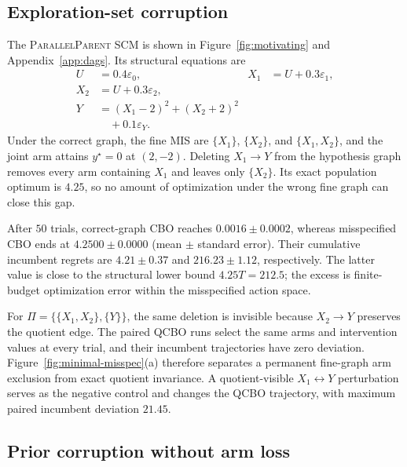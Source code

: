 \documentclass[twoside]{article}
\begin{document}
\subsection{Exploration-set corruption}
\label{sec:exp-a}

The \textsc{ParallelParent} SCM is shown in Figure~\ref{fig:motivating} and
Appendix~\ref{app:dags}. Its structural equations are
\begin{equation}
 \begin{aligned}
 U&=0.4\varepsilon_0,& X_1&=U+0.3\varepsilon_1,\\
 X_2&=U+0.3\varepsilon_2,\\
 Y&=(X_1-2)^2+(X_2+2)^2\\
  &\quad+0.1\varepsilon_Y.
 \end{aligned}
 \label{eq:parallel-parent-scm}
\end{equation}
Under the correct graph, the fine MIS are
$\{X_1\}$, $\{X_2\}$, and $\{X_1,X_2\}$, and the joint arm attains
$y^\star=0$ at $(2,-2)$. Deleting $X_1\to Y$ from the hypothesis graph
removes every arm containing $X_1$ and leaves only $\{X_2\}$. Its exact
population optimum is $4.25$, so no amount of optimization under the wrong
fine graph can close this gap.

After $50$ trials, correct-graph CBO reaches
$0.0016\pm0.0002$, whereas misspecified CBO ends at
$4.2500\pm0.0000$ (mean $\pm$ standard error). Their cumulative incumbent
regrets are $4.21\pm0.37$ and $216.23\pm1.12$, respectively. The latter
value is close to the structural lower bound $4.25T=212.5$; the excess is
finite-budget optimization error within the misspecified action space.

For $\Pi=\{\{X_1,X_2\},\{Y\}\}$, the same deletion is invisible because
$X_2\to Y$ preserves the quotient edge. The paired QCBO runs select the
same arms and intervention values at every trial, and their incumbent
trajectories have zero deviation. Figure~\ref{fig:minimal-misspec}(a) therefore
separates a permanent fine-graph arm exclusion from exact quotient
invariance. A quotient-visible $X_1\leftrightarrow Y$ perturbation serves as
the negative control and changes the QCBO trajectory, with maximum paired
incumbent deviation $21.45$.

\subsection{Prior corruption without arm loss}
\label{sec:exp-b}
\end{document}
